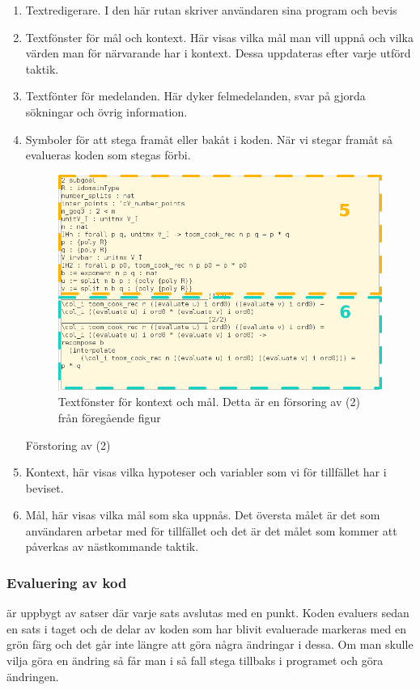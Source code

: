 \begin{enumerate}
\item Textredigerare. I den här rutan skriver användaren sina program och bevis
\item Textfönster för mål och kontext. Här visas vilka mål man vill uppnå och
  vilka värden man för närvarande har i kontext. Dessa uppdateras efter varje
  utförd taktik.
\item Textfönter för medelanden. Här dyker felmedelanden, svar på
  gjorda sökningar och övrig information.
\item Symboler för att stega framåt eller bakåt i koden. När vi stegar framåt
  så evalueras koden som stegas förbi.


\begin{figure}[h!]
  \centering
  \includegraphics[width=150mm]{images/Kontext}
  \caption[Fönster för kontext och mål]
   {Textfönster för kontext och mål. Detta är en försoring av (2) från
     föregående figur}
\end{figure}

Förstoring av (2)
\item Kontext, här visas vilka hypoteser och variabler som vi för tillfället
  har i beviset.
\item Mål, här visas vilka mål som ska uppnås. Det översta målet är det som
  användaren arbetar med för tillfället och det är det målet som kommer att
  påverkas av nästkommande taktik.
\end{enumerate}

\subsubsection{Evaluering av kod}
\coq är uppbygt av satser där varje sats avslutas med en punkt.
Koden evaluers sedan en sats i taget och de delar av koden som
har blivit evaluerade markeras med en grön färg och det går inte längre
att göra några ändringar i dessa. Om man skulle vilja göra en ändring så
får man i så fall stega tillbaks i programet och göra ändringen.


